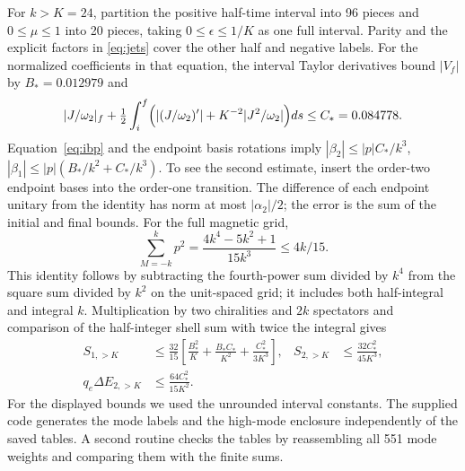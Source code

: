 For $k>K=24$, partition the positive half-time interval into 96 pieces and $0\le\mu\le1$ into 20 pieces, taking $0\le\epsilon\le1/K$ as one full interval. Parity and the explicit factors in \eqref{eq:jets} cover the other half and negative labels. For the normalized coefficients in that equation, the interval Taylor derivatives bound $|V_f|$ by $B_*=0.012979$ and
\[
 |J/\omega_2|_f+\tfrac12\int_i^f\Bigl(|(J/\omega_2)'|+
                  K^{-2}|J^2/\omega_2|\Bigr)ds\le C_*=0.084778.
\]
Equation~\eqref{eq:ibp} and the endpoint basis rotations imply $|\beta_2|\le |p|C_*/k^3$, $|\beta_1|\le |p|(B_*/k^2+C_*/k^3)$. To see the second estimate, insert the order-two endpoint bases into the order-one transition. The difference of each endpoint unitary from the identity has norm at most $|\alpha_2|/2$; the error is the sum of the initial and final bounds. For the full magnetic grid,
\[
 \sum_{M=-k}^k p^2=\frac{4k^4-5k^2+1}{15k^3}\le4k/15 .
\]
This identity follows by subtracting the fourth-power sum divided by $k^4$ from the square sum divided by $k^2$ on the unit-spaced grid; it includes both half-integral and integral $k$. Multiplication by two chiralities and $2k$ spectators and comparison of the half-integer shell sum with twice the integral gives
\begin{align}
 S_{1,>K}&\le\frac{32}{15}\left[\frac{B_*^2}{K}
             +\frac{B_*C_*}{K^2}+\frac{C_*^2}{3K^3}\right],&
 S_{2,>K}&\le\frac{32C_*^2}{45K^3},\nonumber\\
 q_e\Delta E_{2,>K}&\le\frac{64 C_*^2}{15K^2}.
\end{align}
For the displayed bounds we used the unrounded interval constants. The supplied code generates the mode labels and the high-mode enclosure independently of the saved tables. A second routine checks the tables by reassembling all 551 mode weights and comparing them with the finite sums.
